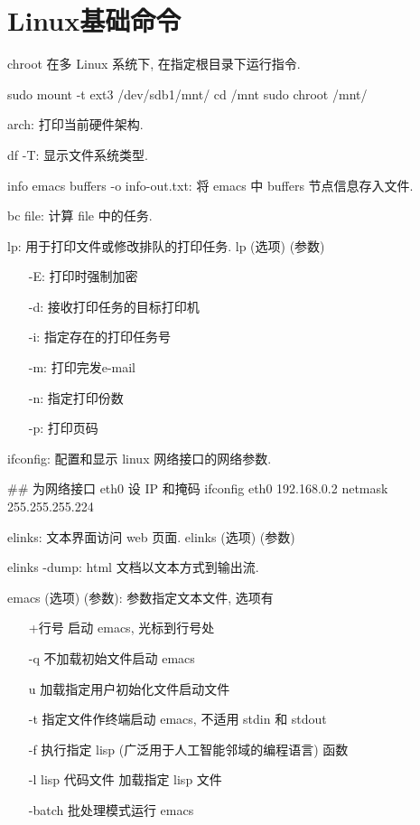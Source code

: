 \chapter{Linux基础命令}

chroot 在多 Linux 系统下, 在指定根目录下运行指令.
\begin{shell}
sudo mount -t ext3 /dev/sdb1/mnt/
cd /mnt
sudo chroot /mnt/
\end{shell}

arch: 打印当前硬件架构.

df -T: 显示文件系统类型.

info emacs buffers -o info-out.txt: 将 emacs 中 buffers 节点信息存入文件.

bc file: 计算 file 中的任务.

lp: 用于打印文件或修改排队的打印任务. lp (选项) (参数)
\begin{itemize}
 \item[-E:] 打印时强制加密
 \item[-d:] 接收打印任务的目标打印机
 \item[-i:] 指定存在的打印任务号
 \item[-m:] 打印完发e-mail
 \item[-n:] 指定打印份数
 \item[-p:] 打印页码
\end{itemize}

ifconfig: 配置和显示 linux 网络接口的网络参数.
\begin{shell}
## 为网络接口 eth0 设 IP 和掩码
ifconfig eth0 192.168.0.2 netmask 255.255.255.224
\end{shell}

elinks: 文本界面访问 web 页面. elinks (选项) (参数)
\begin{shell}
elinks -dump: html 文档以文本方式到输出流.
\end{shell}

emacs (选项) (参数): 参数指定文本文件, 选项有
\begin{itemize}
 \item[+\textlangle 行号\textrangle] 启动 emacs, 光标到行号处
 \item[-q] 不加载初始文件启动 emacs
 \item[u \textlangle用户\textrangle] 加载指定用户初始化文件启动文件
 \item[-t \textlangle文件\textrangle] 指定文件作终端启动 emacs, 不适用 stdin 和 stdout
 \item[-f \textlangle函数\textrangle] 执行指定 lisp (广泛用于人工智能邻域的编程语言) 函数
 \item[-l \textlangle lisp 代码文件\textrangle] 加载指定 lisp 文件
 \item[-batch] 批处理模式运行 emacs
\end{itemize}

